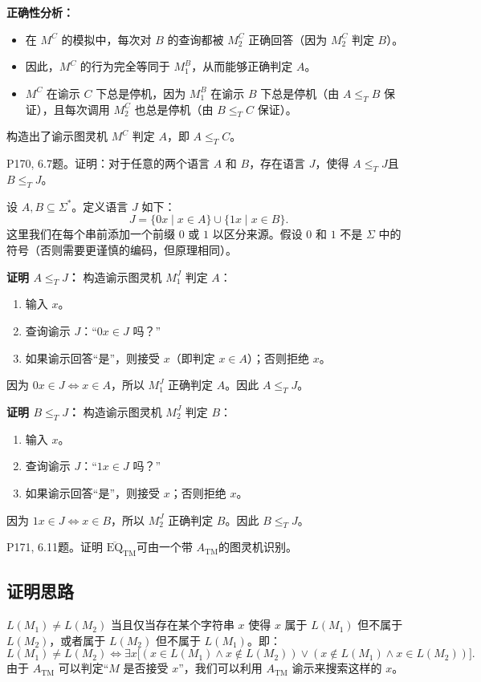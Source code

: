 \documentclass[11pt,addpoints,answers]{exam}
\begin{document}
\begin{questions}
\begin{solution}
\noindent \textbf{正确性分析：}
\begin{itemize}
    \item 在 $M^C$ 的模拟中，每次对 $B$ 的查询都被 $M_2^C$ 正确回答（因为 $M_2^C$ 判定 $B$）。
    \item 因此，$M^C$ 的行为完全等同于 $M_1^B$，从而能够正确判定 $A$。
    \item $M^C$ 在谕示 $C$ 下总是停机，因为 $M_1^B$ 在谕示 $B$ 下总是停机（由 $A \leq_T B$ 保证），且每次调用 $M_2^C$ 也总是停机（由 $B \leq_T C$ 保证）。
\end{itemize}

构造出了谕示图灵机 $M^C$ 判定 $A$，即 $A \leq_T C$。
\end{solution}

\question P170, 6.7题。证明：对于任意的两个语言 $A$ 和 $B$，存在语言 $J$，使得 $A\leq _T J$且  $B\leq _T J$。
\begin{solution}
设 $A, B \subseteq \Sigma^*$。定义语言 $J$ 如下：
\[
J = \{0x \mid x \in A\} \cup \{1x \mid x \in B\}.
\]
这里我们在每个串前添加一个前缀 $0$ 或 $1$ 以区分来源。假设 $0$ 和 $1$ 不是 $\Sigma$ 中的符号（否则需要更谨慎的编码，但原理相同）。

\noindent \textbf{证明 $A \leq_T J$：}  
构造谕示图灵机 $M_1^J$ 判定 $A$：
\begin{enumerate}
    \item 输入 $x$。
    \item 查询谕示 $J$：“$0x \in J$ 吗？”
    \item 如果谕示回答“是”，则接受 $x$（即判定 $x \in A$）；否则拒绝 $x$。
\end{enumerate}
因为 $0x \in J \iff x \in A$，所以 $M_1^J$ 正确判定 $A$。因此 $A \leq_T J$。

\noindent \textbf{证明 $B \leq_T J$：}  
构造谕示图灵机 $M_2^J$ 判定 $B$：
\begin{enumerate}
    \item 输入 $x$。
    \item 查询谕示 $J$：“$1x \in J$ 吗？”
    \item 如果谕示回答“是”，则接受 $x$；否则拒绝 $x$。
\end{enumerate}
因为 $1x \in J \iff x \in B$，所以 $M_2^J$ 正确判定 $B$。因此 $B \leq_T J$。
\end{solution}

\question P171, 6.11题。证明 $\overline{\text{EQ}}_\text{TM}$可由一个带 $A_\text{TM}$的图灵机识别。
\begin{solution}
	\subsection*{证明思路}
    $L(M_1) \neq L(M_2)$ 当且仅当存在某个字符串 $x$ 使得 $x$ 属于 $L(M_1)$ 但不属于 $L(M_2)$，或者属于 $L(M_2)$ 但不属于 $L(M_1)$。即：
    \[
    L(M_1) \neq L(M_2) \iff \exists x \big[ (x \in L(M_1) \land x \notin L(M_2)) \lor (x \notin L(M_1) \land x \in L(M_2)) \big].
    \]
    由于 $A_{\text{TM}}$ 可以判定“$M$ 是否接受 $x$”，我们可以利用 $A_{\text{TM}}$ 谕示来搜索这样的 $x$。
    

\end{solution}
\end{questions}
\end{document}

